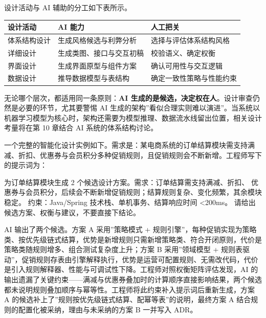 \documentclass[12pt,a4paper,twoside,openany]{ctexbook}
\numberwithin{figure}{chapter}
\numberwithin{table}{chapter}
\newenvironment{Shaded}{}{}
\newcommand{\NormalTok}[1]{#1}
\newcounter{none}
\begin{document}
设计活动与 AI 辅助的分工如下表所示。

{\def\LTcaptype{none} %
\begin{longtable}[]{@{}lll@{}}
\toprule\noalign{}
设计活动 & AI 能力 & 人工把关 \\
\midrule\noalign{}
\endhead
\bottomrule\noalign{}
\endlastfoot
体系结构设计 & 生成风格候选与利弊分析 & 选择与评估体系结构风格 \\
详细设计 & 生成类图、接口与交互初稿 & 校验语义、确定权衡 \\
界面设计 & 生成界面原型与组件方案 & 确认可用性与交互逻辑 \\
数据设计 & 推导数据模型与表结构 & 确定一致性策略与性能约束 \\
\end{longtable}
}

无论哪个层次，都适用同一条原则：\textbf{AI
生成的是候选，决定权在人}。设计审查仍然是必要的环节，尤其要警惕 AI
生成的架构''看似合理实则难以演进''。当系统以机器学习模型为核心时，架构还需要为模型推理、数据流水线留出位置，相关设计考量将在第
10 章结合 AI 系统的体系结构讨论。

一个完整的智能化设计实例如下。需求是：某电商系统的订单结算模块需支持满减、折扣、优惠券与会员积分多种促销规则，且促销规则会不断新增。工程师写下的提示词为：

\begin{Shaded}
\begin{Highlighting}[]
\NormalTok{为订单结算模块生成 2 个候选设计方案。需求：订单结算需支持满减、折扣、}
\NormalTok{优惠券与会员积分，后续会不断新增促销规则；结算规则复杂、变化频繁，其余模块稳定。}
\NormalTok{约束：Java/Spring 技术栈、单机事务、结算响应时间 \textless{}200ms。}
\NormalTok{请给出候选方案、权衡与建议，不要直接下结论。}
\end{Highlighting}
\end{Shaded}

AI 输出了两个候选。方案 A 采用''策略模式 +
规则引擎''，每种促销实现为策略类、按优先级链式结算，优势是新增规则只需新增策略类、符合开闭原则，代价是策略类随规则增多、组合测试复杂度上升；方案
B 采用''领域模型 +
规则表驱动''，促销规则存表由引擎解释执行，优势是运营可配置规则、无需改代码，代价是引入规则解释器、性能与可调试性下降。工程师对照权衡矩阵评估发现，AI
的输出遗漏了关键约束------满减与优惠券叠加时的计算顺序直接影响结果，两个候选都未说明规则叠加顺序与幂等性。工程师将此约束补入提示词后重新生成，方案
A 的候选补上了''规则按优先级链式结算、配幂等表''的说明，最终方案 A
结合规则的配置化被采纳，理由与未采纳的方案 B 一并写入 ADR。
\end{document}
